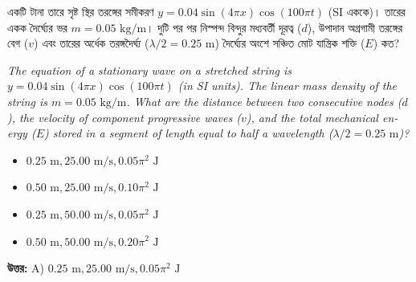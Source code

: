 \documentclass[12pt, a4paper]{article}
\begin{document}
\begin{tcolorbox}[questionbox={প্রশ্ন (Question) 16}]
    \noindent
    একটি টানা তারে সৃষ্ট স্থির তরঙ্গের সমীকরণ $y = 0.04 \sin(4\pi x) \cos(100\pi t)$ (SI এককে)। তারের একক দৈর্ঘ্যের ভর $m = 0.05\text{ kg/m}$। দুটি পর পর নিস্পন্দ বিন্দুর মধ্যবর্তী দূরত্ব ($d$), উপাদান অগ্রগামী তরঙ্গের বেগ ($v$) এবং তারের অর্ধেক তরঙ্গদৈর্ঘ্য ($\lambda/2 = 0.25\text{ m}$) দৈর্ঘ্যের অংশে সঞ্চিত মোট যান্ত্রিক শক্তি ($E$) কত?
    
    \vspace{0.8em}
    \begin{english}
    \noindent\textit{\color{darkgray}
    The equation of a stationary wave on a stretched string is $y = 0.04 \sin(4\pi x) \cos(100\pi t)$ (in SI units). The linear mass density of the string is $m = 0.05\text{ kg/m}$. What are the distance between two consecutive nodes ($d$), the velocity of component progressive waves ($v$), and the total mechanical energy ($E$) stored in a segment of length equal to half a wavelength ($\lambda/2 = 0.25\text{ m}$)?
    }
    \end{english}
\end{tcolorbox}

\begin{itemize}[label={}, leftmargin=1cm, itemsep=0.5em]
    \item[\textbf{A)}] $0.25\text{ m}, 25.00\text{ m/s}, 0.05\pi^2\text{ J}$
    \item[\textbf{B)}] $0.50\text{ m}, 25.00\text{ m/s}, 0.10\pi^2\text{ J}$
    \item[\textbf{C)}] $0.25\text{ m}, 50.00\text{ m/s}, 0.05\pi^2\text{ J}$
    \item[\textbf{D)}] $0.50\text{ m}, 50.00\text{ m/s}, 0.20\pi^2\text{ J}$
\end{itemize}

\vspace{0.5em}
\begin{tcolorbox}[answerbox]
    \textbf{\color{success} উত্তর:} A) $0.25\text{ m}, 25.00\text{ m/s}, 0.05\pi^2\text{ J}$
\end{tcolorbox}
\vspace{1em}
\end{document}
